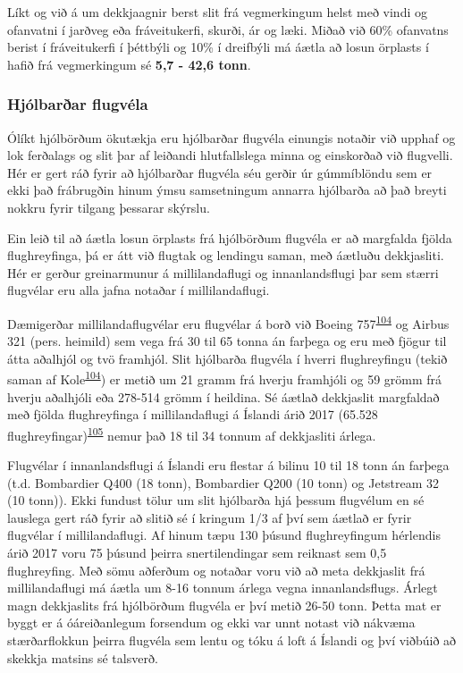 \documentclass[icelandic,]{book}
\begin{document}
Líkt og við á um dekkjaagnir berst slit frá vegmerkingum helst með vindi og ofanvatni í jarðveg eða fráveitukerfi, skurði, ár og læki. Miðað við 60\% ofanvatns berist í fráveitukerfi í þéttbýli og 10\% í dreifbýli má áætla að losun örplasts í hafið frá vegmerkingum sé \textbf{5,7 - 42,6 tonn}.

\hypertarget{hjolbarar-flugvela}{%
\subsubsection*{Hjólbarðar flugvéla}\label{hjolbarar-flugvela}}

Ólíkt hjólbörðum ökutækja eru hjólbarðar flugvéla einungis notaðir við upphaf og lok ferðalags og slit þar af leiðandi hlutfallslega minna og einskorðað við flugvelli. Hér er gert ráð fyrir að hjólbarðar flugvéla séu gerðir úr gúmmíblöndu sem er ekki það frábrugðin hinum ýmsu samsetningum annarra hjólbarða að það breyti nokkru fyrir tilgang þessarar skýrslu.

Ein leið til að áætla losun örplasts frá hjólbörðum flugvéla er að margfalda fjölda flughreyfinga, þá er átt við flugtak og lendingu saman, með áætluðu dekkjasliti. Hér er gerður greinarmunur á millilandaflugi og innanlandsflugi þar sem stærri flugvélar eru alla jafna notaðar í millilandaflugi.

Dæmigerðar millilandaflugvélar eru flugvélar á borð við Boeing 757\textsuperscript{\protect\hyperlink{ref-kole2017wear}{104}} og Airbus 321 (pers. heimild) sem vega frá 30 til 65 tonna án farþega og eru með fjögur til átta aðalhjól og tvö framhjól. Slit hjólbarða flugvéla í hverri flughreyfingu (tekið saman af Kole\textsuperscript{\protect\hyperlink{ref-kole2017wear}{104}}) er metið um 21 gramm frá hverju framhjóli og 59 grömm frá hverju aðalhjóli eða 278-514 grömm í heildina. Sé áætlað dekkjaslit margfaldað með fjölda flughreyfinga í millilandaflugi á Íslandi árið 2017 (65.528 flughreyfingar)\textsuperscript{\protect\hyperlink{ref-isavia2017}{105}} nemur það 18 til 34 tonnum af dekkjasliti árlega.

Flugvélar í innanlandsflugi á Íslandi eru flestar á bilinu 10 til 18 tonn án farþega (t.d. Bombardier Q400 (18 tonn), Bombardier Q200 (10 tonn) og Jetstream 32 (10 tonn)). Ekki fundust tölur um slit hjólbarða hjá þessum flugvélum en sé lauslega gert ráð fyrir að slitið sé í kringum 1/3 af því sem áætlað er fyrir flugvélar í millilandaflugi. Af hinum tæpu 130 þúsund flughreyfingum hérlendis árið 2017 voru 75 þúsund þeirra snertilendingar sem reiknast sem 0,5 flughreyfing. Með sömu aðferðum og notaðar voru við að meta dekkjaslit frá millilandaflugi má áætla um 8-16 tonnum árlega vegna innanlandsflugs. Árlegt magn dekkjaslits frá hjólbörðum flugvéla er því metið 26-50 tonn. Þetta mat er byggt er á óáreiðanlegum forsendum og ekki var unnt notast við nákvæma stærðarflokkun þeirra flugvéla sem lentu og tóku á loft á Íslandi og því viðbúið að skekkja matsins sé talsverð.
\end{document}
